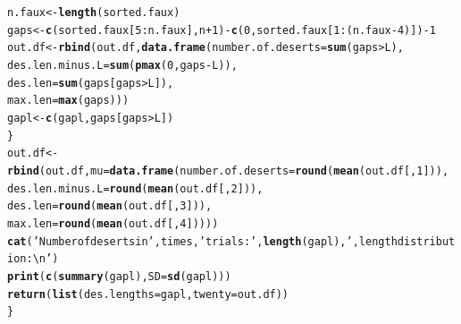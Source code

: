 \documentclass{article}\usepackage[]{graphicx}\usepackage[]{color}
\makeatletter
\newcommand{\hlnum}[1]{\textcolor[rgb]{0.686,0.059,0.569}{#1}}%
\newcommand{\hlstr}[1]{\textcolor[rgb]{0.192,0.494,0.8}{#1}}%
\newcommand{\hlopt}[1]{\textcolor[rgb]{0,0,0}{#1}}%
\newcommand{\hlstd}[1]{\textcolor[rgb]{0.345,0.345,0.345}{#1}}%
\newcommand{\hlkwb}[1]{\textcolor[rgb]{0.69,0.353,0.396}{#1}}%
\newcommand{\hlkwc}[1]{\textcolor[rgb]{0.333,0.667,0.333}{#1}}%
\newcommand{\hlkwd}[1]{\textcolor[rgb]{0.737,0.353,0.396}{\textbf{#1}}}%
\newenvironment{kframe}{%
 \def\at@end@of@kframe{}%
 \ifinner\ifhmode%
  \def\at@end@of@kframe{\end{minipage}}%
  \begin{minipage}{\columnwidth}%
 \fi\fi%
 \def\FrameCommand##1{\hskip\@totalleftmargin \hskip-\fboxsep
 \colorbox{shadecolor}{##1}\hskip-\fboxsep
     \hskip-\linewidth \hskip-\@totalleftmargin \hskip\columnwidth}%
 \MakeFramed {\advance\hsize-\width
   \@totalleftmargin\z@ \linewidth\hsize
   \@setminipage}}%
 {\par\unskip\endMakeFramed%
 \at@end@of@kframe}
\newenvironment{knitrout}{}{} %
\makeatother
\begin{document}
\begin{knitrout}
\begin{kframe}
\begin{alltt}
    \hlstd{n.faux} \hlkwb{<-} \hlkwd{length}\hlstd{(sorted.faux)}
    \hlstd{gaps}   \hlkwb{<-} \hlkwd{c}\hlstd{(sorted.faux[}\hlnum{5}\hlopt{:}\hlstd{n.faux],n}\hlopt{+}\hlnum{1}\hlstd{)}\hlopt{-}\hlkwd{c}\hlstd{(}\hlnum{0}\hlstd{,sorted.faux[}\hlnum{1}\hlopt{:}\hlstd{(n.faux}\hlopt{-}\hlnum{4}\hlstd{)])}\hlopt{-}\hlnum{1}
    \hlstd{out.df} \hlkwb{<-} \hlkwd{rbind}\hlstd{(out.df,} \hlkwd{data.frame}\hlstd{(}\hlkwc{number.of.deserts}\hlstd{=}\hlkwd{sum}\hlstd{(gaps} \hlopt{>} \hlstd{L),}
                                       \hlkwc{des.len.minus.L}  \hlstd{=}\hlkwd{sum}\hlstd{(}\hlkwd{pmax}\hlstd{(}\hlnum{0}\hlstd{, gaps} \hlopt{-} \hlstd{L)),}
                                       \hlkwc{des.len}          \hlstd{=}\hlkwd{sum}\hlstd{(gaps[gaps} \hlopt{>} \hlstd{L]),}
                                       \hlkwc{max.len}          \hlstd{=}\hlkwd{max}\hlstd{(gaps)))}
    \hlstd{gapl} \hlkwb{<-} \hlkwd{c}\hlstd{(gapl, gaps[gaps} \hlopt{>} \hlstd{L])}
  \hlstd{\}}
  \hlstd{out.df} \hlkwb{<-} \hlkwd{rbind}\hlstd{(out.df,} \hlkwc{mu}\hlstd{=}\hlkwd{data.frame}\hlstd{(}\hlkwc{number.of.deserts}\hlstd{=}\hlkwd{round}\hlstd{(}\hlkwd{mean}\hlstd{(out.df[,}\hlnum{1}\hlstd{])),}
                                        \hlkwc{des.len.minus.L}  \hlstd{=}\hlkwd{round}\hlstd{(}\hlkwd{mean}\hlstd{(out.df[,}\hlnum{2}\hlstd{])),}
                                        \hlkwc{des.len}          \hlstd{=}\hlkwd{round}\hlstd{(}\hlkwd{mean}\hlstd{(out.df[,}\hlnum{3}\hlstd{])),}
                                        \hlkwc{max.len}          \hlstd{=}\hlkwd{round}\hlstd{(}\hlkwd{mean}\hlstd{(out.df[,}\hlnum{4}\hlstd{]))))}
  \hlkwd{cat}\hlstd{(}\hlstr{'Number of deserts in'}\hlstd{, times,} \hlstr{'trials:'}\hlstd{,} \hlkwd{length}\hlstd{(gapl),} \hlstr{', length distribution:\textbackslash{}n'}\hlstd{)}
  \hlkwd{print}\hlstd{(}\hlkwd{c}\hlstd{(}\hlkwd{summary}\hlstd{(gapl),}\hlkwc{SD}\hlstd{=}\hlkwd{sd}\hlstd{(gapl)))}
  \hlkwd{return}\hlstd{(}\hlkwd{list}\hlstd{(}\hlkwc{des.lengths}\hlstd{=gapl,} \hlkwc{twenty}\hlstd{=out.df))}
\hlstd{\}}
\end{alltt}
\end{kframe}
\end{knitrout}
\end{document}
